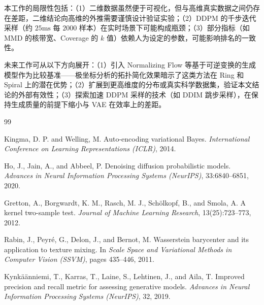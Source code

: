 \documentclass[10pt, a4paper, oneside]{ctexart}
\numberwithin{equation}{section}
\numberwithin{table}{section}
\numberwithin{figure}{section}
\begin{document}
本工作的局限性包括：（1）二维数据虽然便于可视化，但与高维真实数据之间仍存在差距，二维结论向高维的外推需要谨慎设计验证实验；（2）DDPM 的千步迭代采样（约 $25\mathrm{ms}$ 每 $2000$ 样本）在实时场景下可能构成瓶颈；（3）部分指标（如 MMD 的核带宽、Coverage 的 $k$ 值）依赖人为设定的参数，可能影响排名的一致性。

未来工作可从以下方向展开：（1）引入 Normalizing Flow 等基于可逆变换的生成模型作为比较基准——极坐标分析的拓扑简化效果暗示了这类方法在 Ring 和 Spiral 上的潜在优势；（2）扩展到更高维度的分布或真实科学数据集，验证本文结论的外部有效性；（3）探索加速 DDPM 采样的技术（如 DDIM 跳步采样），在保持生成质量的前提下缩小与 VAE 在效率上的差距。

\begin{thebibliography}{99}

Kingma, D. P. and Welling, M.
\newblock Auto-encoding variational Bayes.
\newblock \emph{International Conference on Learning Representations (ICLR)}, 2014.

Ho, J., Jain, A., and Abbeel, P.
\newblock Denoising diffusion probabilistic models.
\newblock \emph{Advances in Neural Information Processing Systems (NeurIPS)}, 33:6840--6851, 2020.

Gretton, A., Borgwardt, K. M., Rasch, M. J., Sch\"{o}lkopf, B., and Smola, A.
\newblock A kernel two-sample test.
\newblock \emph{Journal of Machine Learning Research}, 13(25):723--773, 2012.

Rabin, J., Peyr\'{e}, G., Delon, J., and Bernot, M.
\newblock Wasserstein barycenter and its application to texture mixing.
\newblock In \emph{Scale Space and Variational Methods in Computer Vision (SSVM)}, pages 435--446, 2011.

Kynk\"{a}\"{a}nniemi, T., Karras, T., Laine, S., Lehtinen, J., and Aila, T.
\newblock Improved precision and recall metric for assessing generative models.
\newblock \emph{Advances in Neural Information Processing Systems (NeurIPS)}, 32, 2019.

\end{thebibliography}
\end{document}
